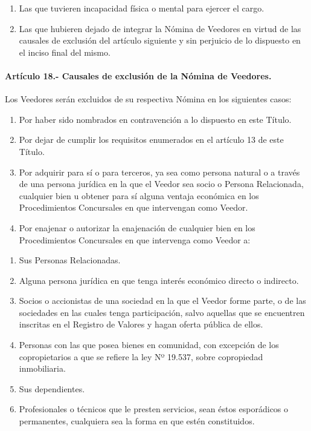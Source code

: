 \documentclass[
]{book}
\begin{document}
\begin{enumerate}
\def\labelenumi{\arabic{enumi})}
\setcounter{enumi}{2}
\item
  Las que tuvieren incapacidad física o mental para ejercer el cargo.
\item
  Las que hubieren dejado de integrar la Nómina de Veedores en virtud de las causales de exclusión del artículo siguiente y sin perjuicio de lo dispuesto en el inciso final del mismo.
\end{enumerate}

\hypertarget{artuxedculo-18.--causales-de-exclusiuxf3n-de-la-nuxf3mina-de-veedores.}{%
\paragraph*{Artículo 18.- Causales de exclusión de la Nómina de Veedores.}\label{artuxedculo-18.--causales-de-exclusiuxf3n-de-la-nuxf3mina-de-veedores.}}

Los Veedores serán excluidos de su respectiva Nómina en los siguientes casos:

\begin{enumerate}
\def\labelenumi{\arabic{enumi})}
\item
  Por haber sido nombrados en contravención a lo dispuesto en este Título.
\item
  Por dejar de cumplir los requisitos enumerados en el artículo 13 de este Título.
\item
  Por adquirir para sí o para terceros, ya sea como persona natural o a través de una persona jurídica en la que el Veedor sea socio o Persona Relacionada, cualquier bien u obtener para sí alguna ventaja económica en los Procedimientos Concursales en que intervengan como Veedor.
\item
  Por enajenar o autorizar la enajenación de cualquier bien en los Procedimientos Concursales en que intervenga como Veedor a:
\end{enumerate}

\begin{enumerate}
\def\labelenumi{\alph{enumi})}
\item
  Sus Personas Relacionadas.
\item
  Alguna persona jurídica en que tenga interés económico directo o indirecto.
\item
  Socios o accionistas de una sociedad en la que el Veedor forme parte, o de las sociedades en las cuales tenga participación, salvo aquellas que se encuentren inscritas en el Registro de Valores y hagan oferta pública de ellos.
\item
  Personas con las que posea bienes en comunidad, con excepción de los copropietarios a que se refiere la ley Nº 19.537, sobre copropiedad inmobiliaria.
\item
  Sus dependientes.
\item
  Profesionales o técnicos que le presten servicios, sean éstos esporádicos o permanentes, cualquiera sea la forma en que estén constituidos.
\end{enumerate}
\end{document}
